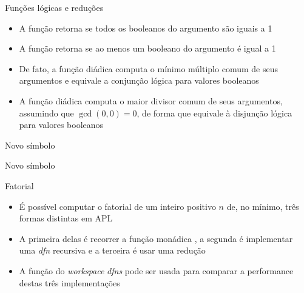 \begin{frame}[fragile]{Funções lógicas e reduções}

    \begin{itemize}
        \item A função  retorna  se todos os booleanos do argumento são iguais a 1
        \pause

        \item A função  retorna  se ao menos um booleano do argumento é igual a 1
        \pause

        \item De fato, a função diádica  computa o mínimo múltiplo comum de seus argumentos e equivale a conjunção lógica para valores booleanos
        \pause

        \item A função diádica  computa o maior divisor comum de seus argumentos, assumindo que $\gcd(0, 0) = 0$, de forma que equivale à disjunção lógica para valores booleanos
    \end{itemize}
\end{frame}

\begin{frame}[fragile]{Novo símbolo}


\end{frame}

\begin{frame}[fragile]{Novo símbolo}

\end{frame}

\begin{frame}[fragile]{Fatorial}

    \begin{itemize}
        \item É possível computar o fatorial de um inteiro positivo $n$  de, no mínimo, três formas
            distintas em APL
        \pause

        \item A primeira delas é recorrer a função monádica , a segunda é 
            implementar uma \textit{dfn} recursiva e a terceira é usar uma redução
        \pause

        \item A função  do \textit{workspace} \textit{dfns} pode ser usada para
            comparar a performance destas três implementações
    \end{itemize}

\end{frame}

